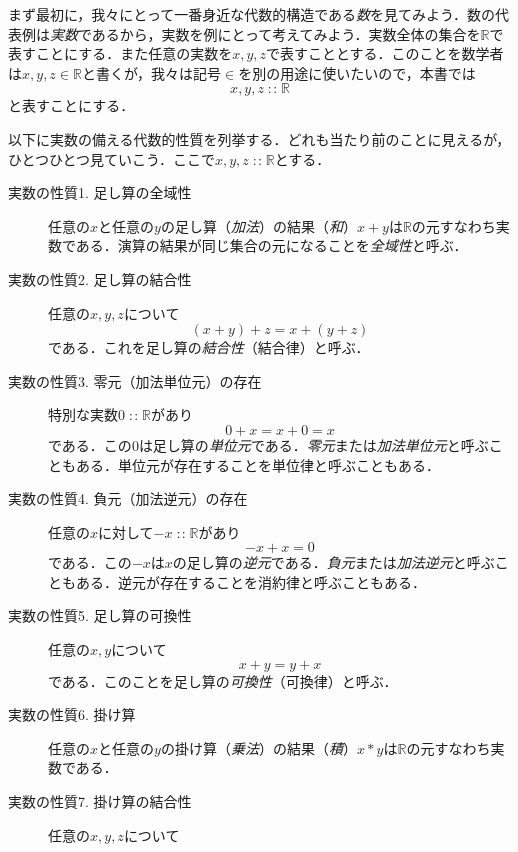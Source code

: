 \documentclass[twocolumn]{jsbook}
\newcommand{\keyword}[1]{{\emph{#1}}}
\DeclareMathOperator{\mathIn}{:\!:}
\newcommand{\mathSpecialSet}[1]{\mathbb{#1}} %
\begin{document}
まず最初に，我々にとって一番身近な代数的構造である\keyword{数}を見てみよう．数の代表例は\keyword{実数}であるから，実数を例にとって考えてみよう．実数全体の集合を$\mathSpecialSet{R}$で表すことにする．また任意の実数を$x,y,z$で表すこととする．このことを数学者は$x,y,z\in\mathSpecialSet{R}$と書くが，我々は記号$\in$を別の用途に使いたいので，本書では
\begin{equation*}
x,y,z\mathIn\mathSpecialSet{R}
\end{equation*}
と表すことにする．

以下に実数の備える代数的性質を列挙する．どれも当たり前のことに見えるが，ひとつひとつ見ていこう．ここで$x,y,z\mathIn\mathSpecialSet{R}$とする．
\begin{description}
\item[実数の性質1. 足し算の全域性] 任意の$x$と任意の$y$の足し算（\keyword{加法}）の結果（\keyword{和}）$x+y$は$\mathSpecialSet{R}$の元すなわち実数である．演算の結果が同じ集合の元になることを\keyword{全域性}と呼ぶ．
\item[実数の性質2. 足し算の結合性] 任意の$x,y,z$について
\begin{equation}
(x+y)+z=x+(y+z)
\end{equation}
である．これを足し算の\keyword{結合性}（結合律）と呼ぶ．
\item[実数の性質3. 零元（加法単位元）の存在] 特別な実数$0\mathIn\mathSpecialSet{R}$があり
\begin{equation}
0+x=x+0=x
\end{equation}
である．この$0$は足し算の\keyword{単位元}である．\keyword{零元}または\keyword{加法単位元}と呼ぶこともある．単位元が存在することを単位律と呼ぶこともある．
\item[実数の性質4. 負元（加法逆元）の存在] 任意の$x$に対して$-x\mathIn\mathSpecialSet{R}$があり
\begin{equation}
-x+x=0
\end{equation}
である．この$-x$は$x$の足し算の\keyword{逆元}である．\keyword{負元}または\keyword{加法逆元}と呼ぶこともある．逆元が存在することを消約律と呼ぶこともある．
\item[実数の性質5. 足し算の可換性] 任意の$x,y$について
\begin{equation}
x+y=y+x
\end{equation}
である．このことを足し算の\keyword{可換性}（可換律）と呼ぶ．
\item[実数の性質6. 掛け算] 任意の$x$と任意の$y$の掛け算（\keyword{乗法}）の結果（\keyword{積}）$x*y$は$\mathSpecialSet{R}$の元すなわち実数である．
\item[実数の性質7. 掛け算の結合性] 任意の$x,y,z$について

\end{description}
\end{document}
